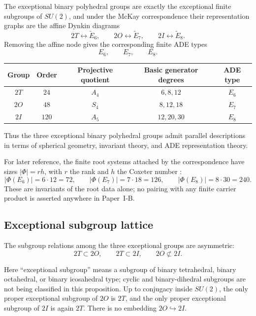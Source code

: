 \documentclass[11pt]{article}
\begin{document}
The exceptional binary polyhedral groups are exactly the exceptional finite subgroups of
\(SU(2)\), and under the McKay correspondence their representation graphs are the affine
Dynkin diagrams \cite{McKay1980,Slodowy1980}
\[
2T \longleftrightarrow \widetilde E_6,\qquad
2O \longleftrightarrow \widetilde E_7,\qquad
2I \longleftrightarrow \widetilde E_8.
\]
Removing the affine node gives the corresponding finite ADE types
\[
E_6,\qquad E_7,\qquad E_8.
\]

\begin{center}
\begin{tabular}{|c|c|c|c|c|}
\hline
Group & Order & Projective quotient & Basic generator degrees & ADE type \\
\hline
\(2T\) & \(24\) & \(A_4\) & \(6,8,12\) & \(E_6\) \\
\(2O\) & \(48\) & \(S_4\) & \(8,12,18\) & \(E_7\) \\
\(2I\) & \(120\) & \(A_5\) & \(12,20,30\) & \(E_8\) \\
\hline
\end{tabular}
\end{center}

Thus the three exceptional binary polyhedral groups admit parallel descriptions in
terms of spherical geometry, invariant theory, and ADE representation theory.

For later reference, the finite root systems attached by the correspondence
have sizes \(|\Phi|=rh\), with \(r\) the rank and \(h\) the Coxeter number
\cite{Humphreys1990}:
\[
|\Phi(E_6)|=6\cdot12=72,\qquad
|\Phi(E_7)|=7\cdot18=126,\qquad
|\Phi(E_8)|=8\cdot30=240.
\]
These are invariants of the root data alone; no pairing with any finite
carrier product is asserted anywhere in Paper~I-B.

\subsection{Exceptional subgroup lattice}
\label{p1:sec:exceptional-lattice}

The subgroup relations among the three exceptional groups are asymmetric:
\[
2T\subset 2O,\qquad 2T\subset 2I,\qquad 2O\not\subset 2I.
\]

\begin{proposition}
\label{p1:prop:exceptional-lattice}
Here ``exceptional subgroup'' means a subgroup of binary tetrahedral, binary octahedral, or binary icosahedral type; cyclic and binary-dihedral subgroups are not being classified in this proposition. Up to conjugacy inside \(SU(2)\), the only proper exceptional subgroup of \(2O\) is \(2T\),
and the only proper exceptional subgroup of \(2I\) is again \(2T\). There is no embedding
\(2O\hookrightarrow 2I\).
\end{proposition}
\end{document}
